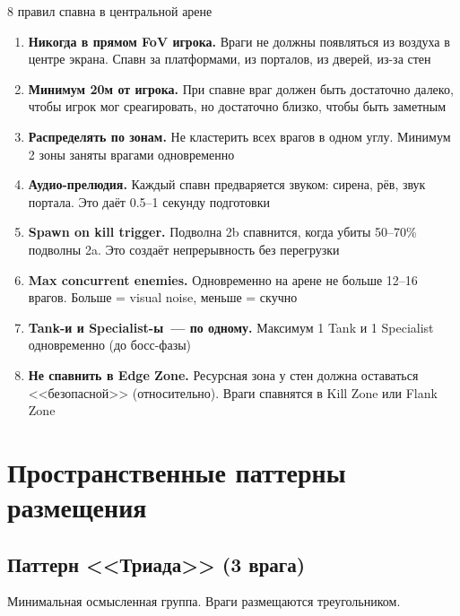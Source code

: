 \documentclass[a4paper,11pt]{report}
\begin{document}
\begin{rulebox}{8 правил спавна в центральной арене}
\begin{enumerate}[leftmargin=*]
  \item \textbf{Никогда в прямом FoV игрока.} Враги не должны появляться
    из воздуха в центре экрана. Спавн за платформами, из порталов,
    из дверей, из-за стен
  \item \textbf{Минимум 20м от игрока.} При спавне враг должен быть
    достаточно далеко, чтобы игрок мог среагировать, но достаточно
    близко, чтобы быть заметным
  \item \textbf{Распределять по зонам.} Не кластерить всех врагов в
    одном углу. Минимум 2 зоны заняты врагами одновременно
  \item \textbf{Аудио-прелюдия.} Каждый спавн предваряется звуком:
    сирена, рёв, звук портала. Это даёт 0.5--1 секунду подготовки
  \item \textbf{Spawn on kill trigger.} Подволна 2b спавнится, когда
    убиты 50--70\% подволны 2a. Это создаёт непрерывность без перегрузки
  \item \textbf{Max concurrent enemies.} Одновременно на арене не
    больше 12--16 врагов. Больше = visual noise, меньше = скучно
  \item \textbf{Tank-и и Specialist-ы~--- по одному.} Максимум 1 Tank
    и 1 Specialist одновременно (до босс-фазы)
  \item \textbf{Не спавнить в Edge Zone.} Ресурсная зона у стен
    должна оставаться <<безопасной>> (относительно). Враги спавнятся
    в Kill Zone или Flank Zone
\end{enumerate}
\end{rulebox}


\chapter{Пространственные паттерны размещения}

\section{Паттерн <<Триада>> (3 врага)}

Минимальная осмысленная группа. Враги размещаются треугольником.
\end{document}
